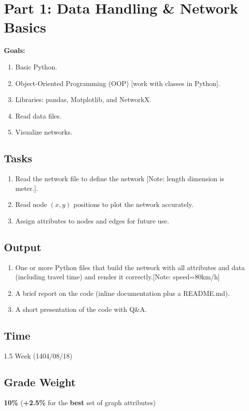 \documentclass{KPS_assignment}
\begin{document}
\maketitle
\section*{Part 1: Data Handling \& Network Basics}

\textbf{Goals:}
\begin{enumerate}
\item Basic Python.
\item Object-Oriented Programming (OOP) [work with classes in Python].
\item Libraries: pandas, Matplotlib, and NetworkX.
\item Read data files.
\item Visualize networks.
\end{enumerate}

\subsection*{Tasks}
\begin{enumerate}
    \item Read the network file to define the network [Note: length dimension is meter.].
    \item Read node $(x, y)$ positions to plot the network accurately.
    \item Assign attributes to nodes and edges for future use.
\end{enumerate}

\subsection*{Output}
\begin{enumerate}
\item One or more Python files that build the network with all attributes and data (including travel time) and render it correctly.[Note: speed=80km/h]
\item A brief report on the code (inline documentation plus a README.md).
\item A short presentation of the code with Q\&A.
\end{enumerate}

\subsection*{Time}
1.5 Week (1404/08/18)

\subsection*{Grade Weight}
\textbf{10\%} (\textbf{+2.5\%} for the \textbf{best} set of graph attributes)
\end{document}
